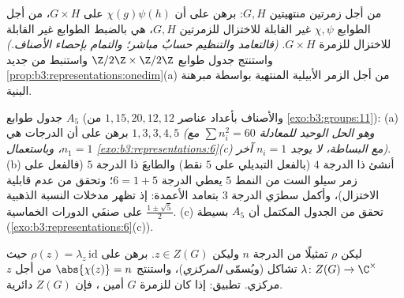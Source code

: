 \begin{exercise}[$\star\star\star$]\label{exo:b3:representations:8}
من أجل زمرتين منتهيتين $G, H$: برهن على أن 
$\chi(g)\psi(h)$ على $G \times H$، من أجل الطوابع $\chi, \psi$
غير القابلة للاختزال للزمرتين $G, H$، هي بالضبط الطوابع غير
القابلة للاختزال للزمرة $G \times H$. \emph{(فالتعامد والتنظيم
حسابٌ مباشر؛ والتمام بإحصاء الأصناف.)} واستنتج جدول طوابع $\Z/2\Z \times \Z/2\Z$
واستنبط من جديد \cref{prop:b3:representations:onedim}(a) من أجل الزمر الأبيلية المنتهية
بواسطة مبرهنة البنية.
\end{exercise}

\begin{exercise}[$\star\star\star$]\label{exo:b3:representations:9}
جدول طوابع $A_5$ (والأصناف بأعداد عناصر $1, 15, 20, 12,
12$ من \cref{exo:b3:groups:11}):
(a) برهن على أن الدرجات هي $1, 3, 3, 4, 5$ \emph{(وهو الحل
الوحيد للمعادلة $\sum n_i^2 = 60$ مع $n_1 = 1$، وباستعمال \cref{exo:b3:representations:6}(c)
مع البساطة، لا يوجد $n_i = 1$ آخر)}.
(b) أنشئ  ذا الدرجة $4$ (بالفعل التبديلي على $5$ نقط)
والطابعَ ذا الدرجة $5$ (فالفعل على زمر سيلو الست من النمط $5$
يعطي الدرجة $6 = 1 + 5$؛ وتحقق من عدم قابلية الاختزال)، وأكمل
سطرَي الدرجة $3$ بتعامد الأعمدة: إذ تظهر مدخلات النسبة الذهبية
$\frac{1\pm\sqrt5}2$ على صنفَي الدورات الخماسية.
(c) تحقق من الجدول المكتمل أن $A_5$ بسيطة (\cref{exo:b3:representations:6}(c)).
\end{exercise}

\begin{exercise}[$\star\star$]\label{exo:b3:representations:10}
ليكن $\rho$ تمثيلًا  من الدرجة $n$ وليكن $z
\in Z(G)$.
برهن على $\rho(z) = \lambda_z\,\mathrm{id}$ حيث $\lambda \colon Z(G) \to \C^\times$ تشاكل (ويُسمّى \emph{
المركزي})، واستنتج $\abs{\chi(z)} = n$ من أجل $z$ مركزي. تطبيق: إذا كان
للزمرة $G$  أمين ، فإن $Z(G)$ دائرية.
\end{exercise}

